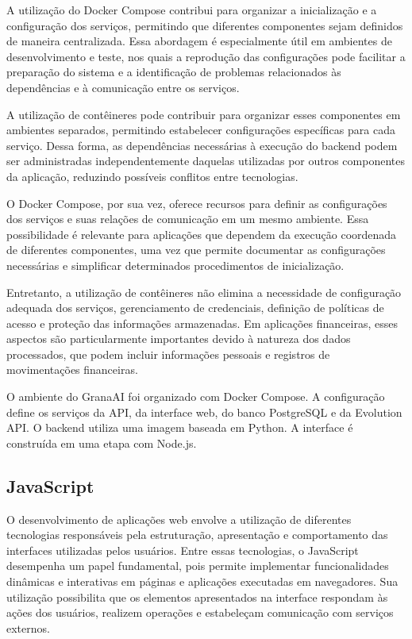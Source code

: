 A utilização do Docker Compose contribui para organizar a inicialização e a configuração dos serviços, permitindo que diferentes componentes sejam definidos de maneira centralizada. Essa abordagem é especialmente útil em ambientes de desenvolvimento e teste, nos quais a reprodução das configurações pode facilitar a preparação do sistema e a identificação de problemas relacionados às dependências e à comunicação entre os serviços.

A utilização de contêineres pode contribuir para organizar esses componentes em ambientes separados, permitindo estabelecer configurações específicas para cada serviço. Dessa forma, as dependências necessárias à execução do backend podem ser administradas independentemente daquelas utilizadas por outros componentes da aplicação, reduzindo possíveis conflitos entre tecnologias.

O Docker Compose, por sua vez, oferece recursos para definir as configurações dos serviços e suas relações de comunicação em um mesmo ambiente. Essa possibilidade é relevante para aplicações que dependem da execução coordenada de diferentes componentes, uma vez que permite documentar as configurações necessárias e simplificar determinados procedimentos de inicialização.

Entretanto, a utilização de contêineres não elimina a necessidade de configuração adequada dos serviços, gerenciamento de credenciais, definição de políticas de acesso e proteção das informações armazenadas. Em aplicações financeiras, esses aspectos são particularmente importantes devido à natureza dos dados processados, que podem incluir informações pessoais e registros de movimentações financeiras.

O ambiente do GranaAI foi organizado com Docker Compose. A configuração define os serviços da API, da interface web, do banco PostgreSQL e da Evolution API. O backend utiliza uma imagem baseada em Python. A interface é construída em uma etapa com Node.js.


\subsection{JavaScript}

O desenvolvimento de aplicações web envolve a utilização de diferentes tecnologias responsáveis pela estruturação, apresentação e comportamento das interfaces utilizadas pelos usuários. Entre essas tecnologias, o JavaScript desempenha um papel fundamental, pois permite implementar funcionalidades dinâmicas e interativas em páginas e aplicações executadas em navegadores. Sua utilização possibilita que os elementos apresentados na interface respondam às ações dos usuários, realizem operações e estabeleçam comunicação com serviços externos.


